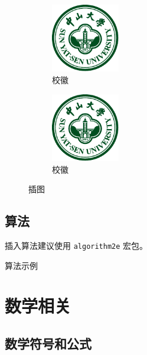 \begin{figure}[H]
    \centering
    \begin{subfigure}{3cm}
        \centering
        \includegraphics[width=3cm]{figures/sysu-badge.pdf}
        \caption{校徽}
    \end{subfigure}
    \hspace{3cm}
    \begin{subfigure}{3cm}
        \centering
        \includegraphics[width=3cm]{figures/sysu-badge.pdf}
        \caption{校徽}
    \end{subfigure}
    \caption{插图}
    \label{fig-example}
\end{figure}

\subsection{算法}

插入算法建议使用 \verb|algorithm2e| 宏包。
\vspace{.5\baselineskip}

\begin{algorithm}[H]
    \caption{算法示例}
    \label{algo:algorithm1}
\end{algorithm}

\section{数学相关}

\subsection{数学符号和公式}

